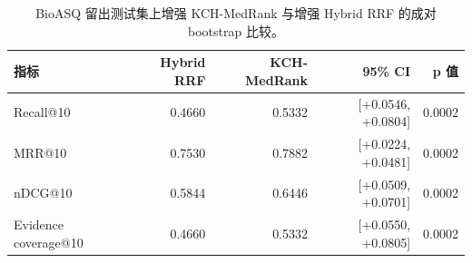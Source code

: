 \begin{table}[t]
\centering
\small
\caption{BioASQ 留出测试集上增强 KCH-MedRank 与增强 Hybrid RRF 的成对 bootstrap 比较。}
\label{tab:enhanced-bioasq-bootstrap-hybrid}
\begin{tabular}{lrrrr}
\toprule
指标 & Hybrid RRF & KCH-MedRank & 95\% CI & p 值 \\
\midrule
Recall@10 & 0.4660 & 0.5332 & [+0.0546, +0.0804] & 0.0002 \\
MRR@10 & 0.7530 & 0.7882 & [+0.0224, +0.0481] & 0.0002 \\
nDCG@10 & 0.5844 & 0.6446 & [+0.0509, +0.0701] & 0.0002 \\
Evidence coverage@10 & 0.4660 & 0.5332 & [+0.0550, +0.0805] & 0.0002 \\
\bottomrule
\end{tabular}
\end{table}

